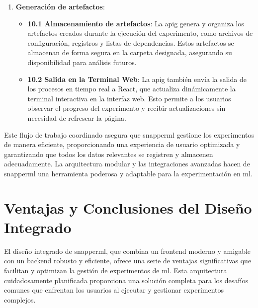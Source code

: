 \begin{enumerate}
    \item \textbf{Generación de \Gls{artefactos}}:
          \begin{itemize}
              \item \textbf{10.1 Almacenamiento de \Gls{artefactos}}: La \Gls{apig} genera y organiza los \gls{artefactos} creados durante la ejecución del experimento, como archivos de configuración, registros y listas de dependencias. Estos \gls{artefactos} se almacenan de forma segura en la carpeta designada, asegurando su disponibilidad para análisis futuros.
              \item \textbf{10.2 Salida en la Terminal Web}: La \Gls{apig} también envía la salida de los procesos en tiempo real a React, que actualiza dinámicamente la terminal interactiva en la interfaz web. Esto permite a los usuarios observar el progreso del experimento y recibir actualizaciones sin necesidad de refrescar la página.
          \end{itemize}
\end{enumerate}

Este flujo de trabajo coordinado asegura que \Gls{snapperml} gestione los experimentos de manera eficiente, proporcionando una experiencia de usuario optimizada y garantizando que todos los datos relevantes se registren y almacenen adecuadamente. La arquitectura modular y las integraciones avanzadas hacen de \Gls{snapperml} una herramienta poderosa y adaptable para la experimentación en \acrshort{ml}.

\section{Ventajas y Conclusiones del Diseño Integrado}

El diseño integrado de \Gls{snapperml}, que combina un \gls{frontend} moderno y amigable con un \gls{backend} robusto y eficiente, ofrece una serie de ventajas significativas que facilitan y optimizan la gestión de experimentos de \acrlong{ml}. Esta arquitectura cuidadosamente planificada proporciona una solución completa para los desafíos comunes que enfrentan los usuarios al ejecutar y gestionar experimentos complejos.

